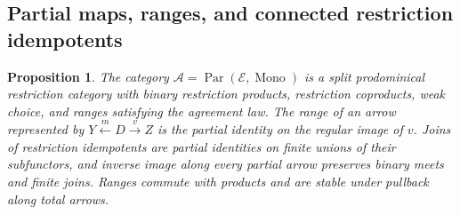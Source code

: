 \documentclass[11pt]{article}
\newtheorem{proposition}[theorem]{Proposition}
\begin{document}
\subsection{Partial maps, ranges, and connected restriction idempotents}

\begin{proposition}\label{prop:fork-structure}
The category $\mathcal A=\operatorname{Par}(\mathcal E,
\operatorname{Mono})$ is a split prodominical restriction category
with binary restriction products, restriction coproducts, weak
choice, and ranges satisfying the agreement law. The range of an arrow
represented by $Y\xleftarrow{m}D\xrightarrow{v}Z$ is the partial
identity on the regular image of $v$.
Joins of restriction idempotents are partial identities on finite
unions of their subfunctors, and inverse image along every partial
arrow preserves binary meets and finite joins. Ranges commute with products and
are stable under pullback along total arrows.
\end{proposition}
\end{document}

